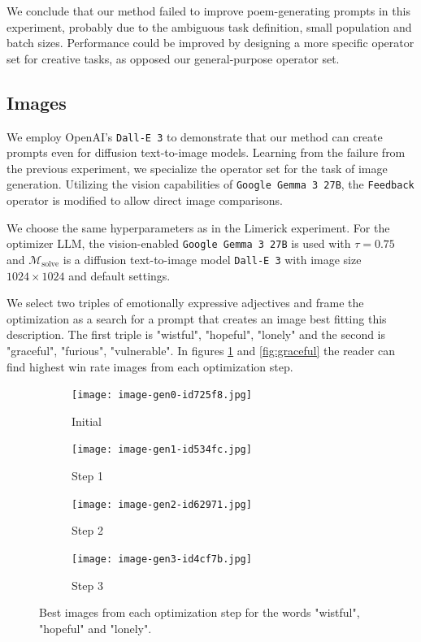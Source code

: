We conclude that our method failed to improve poem-generating prompts in this experiment, probably due to the 
ambiguous task definition, small population and batch sizes. Performance could be improved by designing 
a more specific operator set for creative tasks, as opposed our general-purpose operator set.

\subsection{Images}
We employ OpenAI's \texttt{Dall-E 3}\cite{BetkerImprovingIG} to demonstrate that our method can create prompts even for diffusion text-to-image models.
Learning from the failure from the previous experiment, we specialize the operator set for the task of image generation.
Utilizing the vision capabilities of \texttt{Google Gemma 3 27B}, the \texttt{Feedback} operator is modified to allow direct image comparisons. 

We choose the same hyperparameters as in the Limerick experiment. For the optimizer LLM, the vision-enabled \texttt{Google Gemma 3 27B} is used with $\tau = 0.75$ and 
$\mathcal{M}_{\text{solve}}$ is a diffusion text-to-image model \texttt{Dall-E 3} with image size $1024\times1024$ and default settings.

We select two triples of emotionally expressive adjectives and frame the optimization as a search for a prompt that creates an image best fitting this description. 
The first triple is "wistful", "hopeful", "lonely" and the second is "graceful", "furious", "vulnerable". In figures \ref{fig:wistful} and \ref{fig:graceful} the reader can find
highest win rate images from each optimization step.


\begin{figure}[htbp]
    \centering

    \begin{subfigure}{0.24\linewidth}
        \texttt{[image: image-gen0-id725f8.jpg]}
        \caption{Initial}
    \end{subfigure}
    \hfill
    \begin{subfigure}{0.24\linewidth}
        \texttt{[image: image-gen1-id534fc.jpg]}
        \caption{Step 1}
    \end{subfigure}
    \hfill
    \begin{subfigure}{0.24\linewidth}
        \texttt{[image: image-gen2-id62971.jpg]}
        \caption{Step 2}
    \end{subfigure}
    \hfill
    \begin{subfigure}{0.24\linewidth}
        \texttt{[image: image-gen3-id4cf7b.jpg]}
        \caption{Step 3}
    \end{subfigure}

    \caption{Best images from each optimization step for the words "wistful", "hopeful" and "lonely".}
    \label{fig:wistful}
\end{figure}

